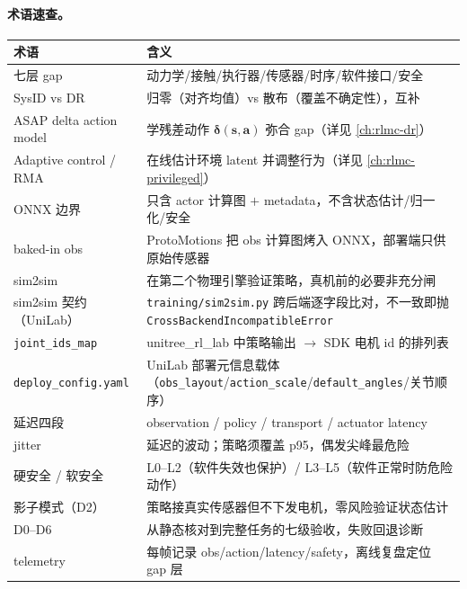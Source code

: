 \paragraph{术语速查。}
\begin{center}
\small
\begin{tabular}{@{}lp{8.6cm}@{}}
\toprule
术语 & 含义 \\
\midrule
七层 gap & 动力学/接触/执行器/传感器/时序/软件接口/安全 \\
SysID vs DR & 归零（对齐均值）vs 散布（覆盖不确定性），互补 \\
ASAP delta action model & 学残差动作 $\boldsymbol\delta(\mathbf s,\mathbf a)$ 弥合 gap（详见 \cref{ch:rlmc-dr}） \\
Adaptive control / RMA & 在线估计环境 latent 并调整行为（详见 \cref{ch:rlmc-privileged}） \\
ONNX 边界 & 只含 actor 计算图 $+$ metadata，不含状态估计/归一化/安全 \\
baked-in obs & ProtoMotions 把 obs 计算图烤入 ONNX，部署端只供原始传感器 \\
sim2sim & 在第二个物理引擎验证策略，真机前的必要非充分闸 \\
sim2sim 契约（UniLab） & \verb|training/sim2sim.py| 跨后端逐字段比对，不一致即抛 \verb|CrossBackendIncompatibleError| \\
\verb|joint_ids_map| & unitree\_rl\_lab 中策略输出 $\to$ SDK 电机 id 的排列表 \\
\verb|deploy_config.yaml| & UniLab 部署元信息载体（\verb|obs_layout|/\verb|action_scale|/\verb|default_angles|/关节顺序） \\
延迟四段 & observation / policy / transport / actuator latency \\
jitter & 延迟的波动；策略须覆盖 p95，偶发尖峰最危险 \\
硬安全 / 软安全 & L0--L2（软件失效也保护）/ L3--L5（软件正常时防危险动作） \\
影子模式（D2） & 策略接真实传感器但不下发电机，零风险验证状态估计 \\
D0--D6 & 从静态核对到完整任务的七级验收，失败回退诊断 \\
telemetry & 每帧记录 obs/action/latency/safety，离线复盘定位 gap 层 \\
\bottomrule
\end{tabular}
\end{center}

